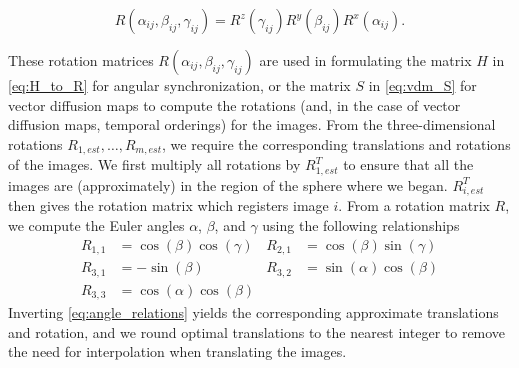 \documentclass{pnastwo}
\begin{document}
\begin{article}
\begin{materials}
\begin{equation} \label{eq:total_rot}
	R(\alpha_{ij}, \beta_{ij}, \gamma_{ij})	 = R^z(\gamma_{ij})  R^y(\beta_{ij})  R^x(\alpha_{ij}).
\end{equation}
%

These rotation matrices $R(\alpha_{ij}, \beta_{ij}, \gamma_{ij})$ are used in formulating the matrix $H$ in \eqref{eq:H_to_R} for angular synchronization, or the matrix $S$ in \eqref{eq:vdm_S} for vector diffusion maps to compute the rotations (and, in the case of vector diffusion maps, temporal orderings) for the images.
%
From the three-dimensional rotations $R_{1, est}, \dots, R_{m, est}$, we  require the corresponding translations and rotations of the images.
%
We first multiply all rotations by $R_{1, est}^T$ to ensure that all the images are (approximately) in the region of the sphere where we began.
%
$R_{i,est}^T$ then gives the rotation matrix which registers image $i$.
%
From a rotation matrix $R$, we compute the Euler angles $\alpha$, $\beta$, and $\gamma$ using the following relationships
\begin{equation}
\begin{aligned}
R_{1,1} & = \cos(\beta)\cos(\gamma) &
R_{2,1} & = \cos(\beta)\sin(\gamma) \\
R_{3,1} & = -\sin(\beta) &
R_{3,2} & = \sin(\alpha)\cos(\beta) \\
R_{3,3} & = \cos(\alpha)\cos(\beta)  &
\end{aligned}
\end{equation}
%
Inverting \eqref{eq:angle_relations} yields the corresponding approximate translations and rotation, and we round optimal translations to the nearest integer to remove the need for interpolation when translating the images.


\end{materials}
\end{article}
\end{document}

